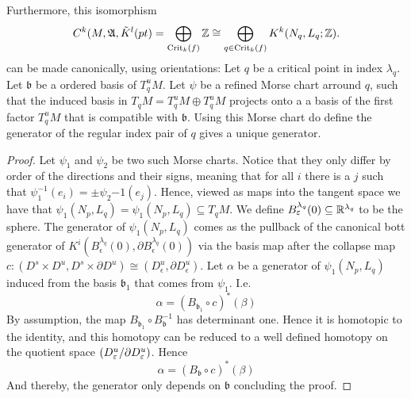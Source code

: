 \begin{remark}
		Furthermore, this isomorphism 
		\begin{equation} \label{ kritical points as direct sum of homology groups}
			C^{k}(M,\mathfrak{A},\tilde{K}^{l}(pt)=\bigoplus_{ \Crit_k(f)} \Z \cong \bigoplus_{q\in \Crit_k(f)} K^k(N_q,L_q;\Z).
		\end{equation}
		can be made canonically, using orientations: Let $q$ be a critical point in index $\lambda_q$. Let $\mathfrak{b}$ be a ordered basis of $T^u_qM$. Let $\psi$ be a refined Morse chart arround $q$, such that the induced basis in $T_qM=T^u_qM\oplus T^u_qM$ projects onto a a basis of the first factor $T^u_qM$ that is compatible with $\mathfrak{b}$. Using this Morse chart do define the generator of the regular index pair of $q$ gives a unique generator.
\end{remark}
\begin{proof}
	Let $\psi_1$ and $\psi_2$ be two such Morse charts. Notice that they only differ by order of the directions and their signs, meaning that for all $i$ there is a $j$ such that $\psi_1^{-1}(e_i)=\pm \psi_2{-1}(e_j)$. Hence, viewed as maps into the tangent space we have that $\psi_1(N_p,L_q)=\psi_1(N_p,L_q)\subseteq T_qM$. We define $B^{\lambda_{q}}_{\epsilon}(0)\subseteq \R^{\lambda_q}$ to be the sphere. The generator of $\psi_1(N_p,L_q)$ comes as the pullback of the canonical bott generator of $K^i(B^{\lambda_{q}}_{\epsilon}(0),\partial B^{\lambda_{q}}_{\epsilon}(0))$ via the basis map after the collapse map $c:(D^{ s}\times  D^{u }, D^{s}\times \partial D^{u}) \cong (D^{u}_{\epsilon},\partial D^{u}_{\epsilon} )$. Let $\alpha$ be a generator of $\psi_1(N_p,L_q)$ induced from the basis $\mathfrak{b_1}$ that comes from $\psi_1$. I.e. 
	\begin{equation*}
		\alpha=\left( B_{\mathfrak{b}_1}\circ c\right)^*(\beta)
	\end{equation*} By assumption, the map $ B_{\mathfrak{b}_1}\circ  B_{\mathfrak{b}}^{-1}$ has determinant one. Hence it is homotopic to the identity, and this homotopy can be reduced to a well defined homotopy on the quotient space $\left(D^{u}_{\epsilon}\middle/ \partial D^{u}_{\epsilon} \right)$. Hence
	\begin{equation*}
		\alpha=\left( B_{\mathfrak{b}}\circ c\right)^*(\beta)
	\end{equation*} And thereby, the generator only depends on $\mathfrak{b}$ concluding the proof.
\end{proof}

